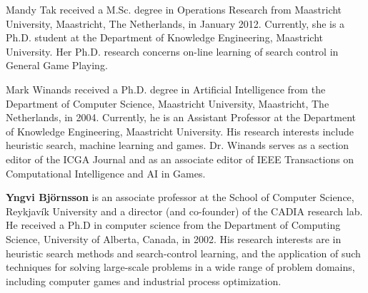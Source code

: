 \documentclass[journal]{IEEEtran}
\begin{document}





\begin{IEEEbiography}{Mandy Tak}
received a M.Sc. degree in Operations Research from Maastricht University, Maastricht, The Netherlands, in January 2012. Currently, she is a Ph.D. student at the Department of Knowledge Engineering, Maastricht University. Her Ph.D. research concerns on-line learning of search control in General Game Playing.
\end{IEEEbiography}


\begin{IEEEbiography}{Mark Winands}
received a Ph.D. degree in Artificial Intelligence from the Department of
Computer Science, Maastricht University, Maastricht, The Netherlands, in 2004.
Currently, he is an Assistant Professor at the Department of Knowledge Engineering, Maastricht University. His research interests include heuristic search, machine learning and games.
Dr. Winands serves as a section editor of the ICGA Journal and as an associate editor of IEEE Transactions on Computational Intelligence and AI in Games.
\end{IEEEbiography}


\begin{IEEEbiography}{\bf Yngvi Bj\"{o}rnsson}
is an associate professor at the School of Computer Science, Reykjav\'{i}k University and a director (and co-founder) of the CADIA research lab. He received a Ph.D in computer science from the Department of Computing Science, University of Alberta, Canada, in 2002.  His research interests are in heuristic search methods and search-control learning,  and the application of such techniques for solving large-scale problems in a wide range of problem domains, including computer games and industrial process optimization. 
\end{IEEEbiography}







\end{document}
